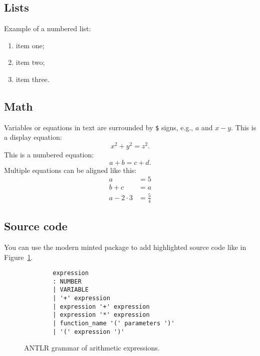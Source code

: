 \subsection{Lists}

Example of a numbered list:
\begin{enumerate}
    \item item one;
    \item item two;
    \item item three.
\end{enumerate}


\subsection{Math}

Variables or equations in text are surrounded by \verb|$| signs, e.g., $a$ and $x - y$.
This is a display equation:
\[
    x^2 + y^2 = z^2.
\]
This is a numbered equation:
\begin{equation}
    a + b = c + d.
    \label{eq:abcd}
\end{equation}
Multiple equations can be aligned like this:
\begin{align*} %
    a &= 5 \\
    b + c &= a \\
    a - 2 \cdot 3 &= \frac{5}{4}
\end{align*}


\subsection{Source code}

You can use the modern minted package to add highlighted source code like in Figure~\ref{fig:parser_exp}.

\begin{figure}
    \begin{verbatim}
        expression
        : NUMBER
        | VARIABLE
        | '+' expression
        | expression '+' expression
        | expression '*' expression
        | function_name '(' parameters ')'
        | '(' expression ')'
    \end{verbatim}
    \caption{ANTLR grammar of arithmetic expressions.}
    \label{fig:parser_exp}
\end{figure}

